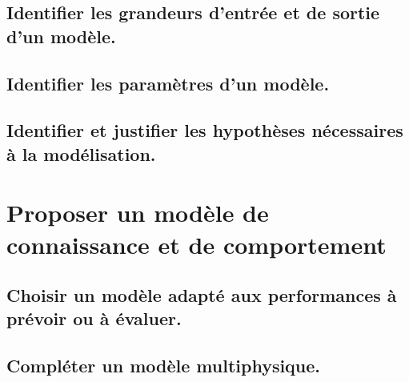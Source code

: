 \documentclass[10pt,fleqn]{article}
\begin{document}
\begin{multicols}{2} 

\end{multicols}

\subsection{Identifier les grandeurs d'entrée et de sortie d’un modèle.} 

\begin{multicols}{2} 

\end{multicols}

\subsection{Identifier les paramètres d’un modèle.} 

\begin{multicols}{2} 

\end{multicols}

\subsection{Identifier et justifier les hypothèses nécessaires à la modélisation.} 

\begin{multicols}{2} 

\end{multicols}

\section{Proposer un modèle de connaissance et de comportement} 

\subsection{Choisir un modèle adapté aux performances à prévoir ou à évaluer.} 

\begin{multicols}{2} 

\end{multicols}

\subsection{Compléter un modèle multiphysique.} 
\end{document}
